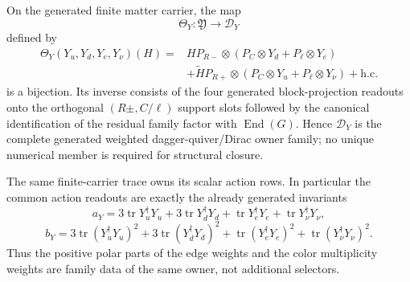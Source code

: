 \documentclass[12pt,a4paper]{article}
\begin{document}
\begin{theorem}
\label{p5:thm:v186-generated-yukawa-dirac-owner-family}
On the generated finite matter carrier, the map
\[
 \Theta_Y:\mathfrak Y\longrightarrow\mathscr D_Y
\]
defined by
\begin{align}
 \Theta_Y(Y_u,Y_d,Y_e,Y_\nu)(H)
 ={}&H P_{R-}\otimes(P_C\otimes Y_d+P_\ell\otimes Y_e)\nonumber\\
 &+\widetilde H P_{R+}\otimes(P_C\otimes Y_u+P_\ell\otimes Y_\nu)
 +\mathrm{h.c.}
 \label{p5:eq:v186-yukawa-owner-map}
\end{align}
is a bijection.  Its inverse consists of the four generated block-projection
readouts onto the orthogonal $(R\pm,C/\ell)$ support slots followed by the
canonical identification of the residual family factor with
$\operatorname{End}(G)$.  Hence $\mathscr D_Y$ is the complete generated
weighted dagger-quiver/Dirac owner family; no unique numerical member is
required for structural closure.

The same finite-carrier trace owns its scalar action rows.  In particular the
common action readouts are exactly the already generated invariants
\[
 a_Y=3\operatorname{tr}Y_u^\dagger Y_u
     +3\operatorname{tr}Y_d^\dagger Y_d
     +\operatorname{tr}Y_e^\dagger Y_e
     +\operatorname{tr}Y_\nu^\dagger Y_\nu,
\]
\[
 b_Y=3\operatorname{tr}(Y_u^\dagger Y_u)^2
     +3\operatorname{tr}(Y_d^\dagger Y_d)^2
     +\operatorname{tr}(Y_e^\dagger Y_e)^2
     +\operatorname{tr}(Y_\nu^\dagger Y_\nu)^2.
\]
Thus the positive polar parts of the edge weights and the color multiplicity
weights are family data of the same owner, not additional selectors.
\end{theorem}
\end{document}

